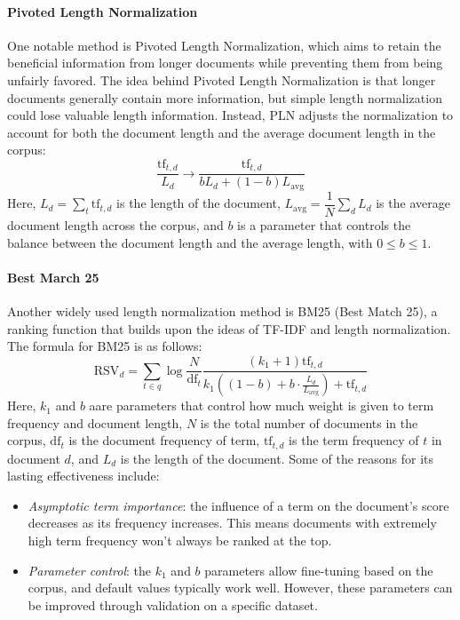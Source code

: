 \paragraph*{Pivoted Length Normalization}
One notable method is Pivoted Length Normalization, which aims to retain the beneficial information from longer documents while preventing them from being unfairly favored.
The idea behind Pivoted Length Normalization is that longer documents generally contain more information, but simple length normalization could lose valuable length information. 
Instead, PLN adjusts the normalization to account for both the document length and the average document length in the corpus:
\[\dfrac{\text{tf}_{t,d}}{L_d}\rightarrow\dfrac{\text{tf}_{t,d}}{bL_d+(1-b)L_{\text{avg}}}\]
Here, $L_d=\sum_{t}\text{tf}_{t,d}$ is the length of the document, $L_{\text{avg}}=\dfrac{1}{N}\sum_dL_d$ is the average document length across the corpus, and $b$ is a parameter that controls the balance between the document length and the average length, with $0\leq b \leq 1$. 

\paragraph*{Best March 25}
Another widely used length normalization method is BM25 (Best Match 25), a ranking function that builds upon the ideas of TF-IDF and length normalization. 
The formula for BM25 is as follows:
\[\text{RSV}_d=\sum_{t \in q}\log\dfrac{N}{\text{df}_t}\dfrac{(k_1+1)\text{tf}_{t,d}}{k_1\left((1-b)+b\cdot\frac{L_d}{L_{\text{avg}}}\right)+\text{tf}_{t,d}}\]
Here, $k_1$ and $b$ aare parameters that control how much weight is given to term frequency and document length, $N$ is the total number of documents in the corpus, $\text{df}_t$ is the document frequency of term, $\text{tf}_{t,d}$ is the term frequency of $t$ in document $d$, and $L_d$ is the length of the document.
Some of the reasons for its lasting effectiveness include:
\begin{itemize}
    \item \textit{Asymptotic term importance}: the influence of a term on the document's score decreases as its frequency increases. 
        This means documents with extremely high term frequency won't always be ranked at the top.
    \item \textit{Parameter control}: the $k_1$ and $b$ parameters allow fine-tuning based on the corpus, and default values typically work well. 
        However, these parameters can be improved through validation on a specific dataset.
\end{itemize}
